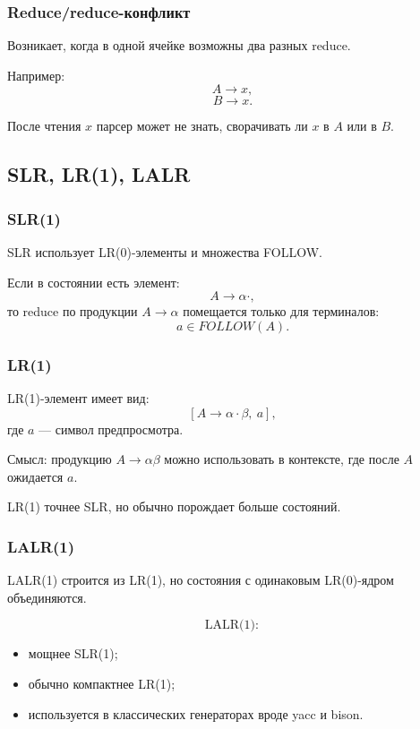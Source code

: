 \documentclass[12pt,a4paper]{article}
\theoremstyle{definition}
\theoremstyle{plain}
\begin{document}
\subsubsection*{Reduce/reduce-конфликт}

Возникает, когда в одной ячейке возможны два разных reduce.

Например:
\[
A\to x,
\]
\[
B\to x.
\]

После чтения $x$ парсер может не знать, сворачивать ли $x$ в $A$ или в $B$.

\subsection{SLR, LR(1), LALR}

\subsubsection*{SLR(1)}

SLR использует LR(0)-элементы и множества FOLLOW.

Если в состоянии есть элемент:
\[
A\to \alpha\cdot,
\]
то reduce по продукции $A\to\alpha$ помещается только для терминалов:
\[
a\in FOLLOW(A).
\]

\subsubsection*{LR(1)}

LR(1)-элемент имеет вид:
\[
[A\to \alpha\cdot\beta,\ a],
\]
где $a$ --- символ предпросмотра.

Смысл: продукцию $A\to\alpha\beta$ можно использовать в контексте, где после $A$ ожидается $a$.

LR(1) точнее SLR, но обычно порождает больше состояний.

\subsubsection*{LALR(1)}

LALR(1) строится из LR(1), но состояния с одинаковым LR(0)-ядром объединяются.

\[
\text{LALR(1)}:
\]
\begin{itemize}
    \item мощнее SLR(1);
    \item обычно компактнее LR(1);
    \item используется в классических генераторах вроде yacc и bison.
\end{itemize}
\end{document}

